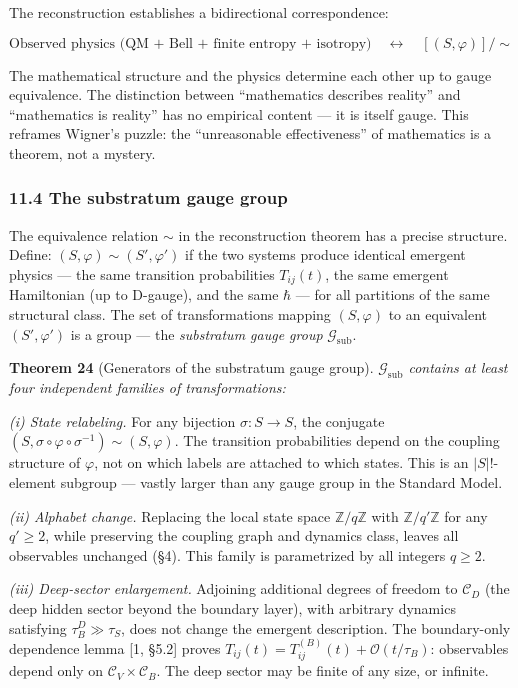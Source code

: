 \documentclass[
  11pt,
]{article}
\begin{document}
The reconstruction establishes a bidirectional correspondence:

\[\text{Observed physics (QM + Bell + finite entropy + isotropy)} \quad \longleftrightarrow \quad [(S, \varphi)] / \sim\]

The mathematical structure and the physics determine each other up to
gauge equivalence. The distinction between ``mathematics describes
reality'' and ``mathematics is reality'' has no empirical content --- it
is itself gauge. This reframes Wigner's puzzle: the ``unreasonable
effectiveness'' of mathematics is a theorem, not a mystery.

\hypertarget{the-substratum-gauge-group}{%
\subsubsection{11.4 The substratum gauge
group}\label{the-substratum-gauge-group}}

The equivalence relation \(\sim\) in the reconstruction theorem has a
precise structure. Define: \((S, \varphi) \sim (S', \varphi')\) if the
two systems produce identical emergent physics --- the same transition
probabilities \(T_{ij}(t)\), the same emergent Hamiltonian (up to
D-gauge), and the same \(\hbar\) --- for all partitions of the same
structural class. The set of transformations mapping \((S, \varphi)\) to
an equivalent \((S', \varphi')\) is a group --- the \emph{substratum
gauge group} \(\mathcal{G}_{\text{sub}}\).

\textbf{Theorem 24} (Generators of the substratum gauge group).
\emph{\(\mathcal{G}_{\text{sub}}\) contains at least four independent
families of transformations:}

\emph{(i) State relabeling.} For any bijection \(\sigma: S \to S\), the
conjugate
\((S, \sigma \circ \varphi \circ \sigma^{-1}) \sim (S, \varphi)\). The
transition probabilities depend on the coupling structure of
\(\varphi\), not on which labels are attached to which states. This is
an \(|S|!\)-element subgroup --- vastly larger than any gauge group in
the Standard Model.

\emph{(ii) Alphabet change.} Replacing the local state space
\(\mathbb{Z}/q\mathbb{Z}\) with \(\mathbb{Z}/q'\mathbb{Z}\) for any
\(q' \geq 2\), while preserving the coupling graph and dynamics class,
leaves all observables unchanged (§4). This family is parametrized by
all integers \(q \geq 2\).

\emph{(iii) Deep-sector enlargement.} Adjoining additional degrees of
freedom to \(\mathcal{C}_D\) (the deep hidden sector beyond the boundary
layer), with arbitrary dynamics satisfying \(\tau_B^D \gg \tau_S\), does
not change the emergent description. The boundary-only dependence lemma
{[}1, §5.2{]} proves
\(T_{ij}(t) = T_{ij}^{(B)}(t) + \mathcal{O}(t/\tau_B)\): observables
depend only on \(\mathcal{C}_V \times \mathcal{C}_B\). The deep sector
may be finite of any size, or infinite.
\end{document}
